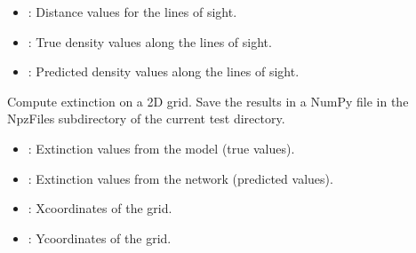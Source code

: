 \documentclass[letterpaper,10pt,english]{sphinxmanual}
\begin{document}
\begin{fulllineitems}
\begin{fulllineitems}
\begin{description}
\begin{itemize}
\item {} 
\sphinxAtStartPar
{}: Distance values for the lines of sight.

\item {} 
\sphinxAtStartPar
{}: True density values along the lines of sight.

\item {} 
\sphinxAtStartPar
{}: Predicted density values along the lines of sight.

\end{itemize}

\end{description}

\end{fulllineitems}


\begin{fulllineitems}
\label{\detokenize{Calculator:Calculator.Calculator.compute_extinction_grid}}
\pysigstartsignatures
{}
\pysigstopsignatures
\sphinxAtStartPar
Compute extinction on a 2D grid.
Save the results in a NumPy file in the NpzFiles subdirectory of the current test directory.
\begin{description}
\begin{itemize}
\item {} 
\sphinxAtStartPar
{}: Extinction values from the model (true values).

\item {} 
\sphinxAtStartPar
{}: Extinction values from the network (predicted values).

\item {} 
\sphinxAtStartPar
{}: X\sphinxhyphen{}coordinates of the grid.

\item {} 
\sphinxAtStartPar
{}: Y\sphinxhyphen{}coordinates of the grid.

\end{itemize}

\end{description}


\end{fulllineitems}
\end{fulllineitems}
\end{document}
